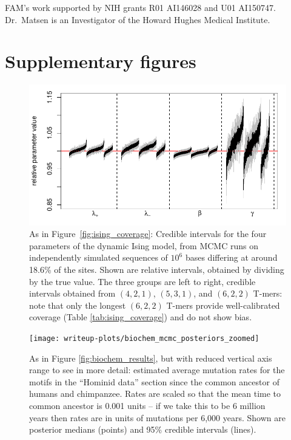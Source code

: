 \documentclass{article}
\theoremstyle{plain}
\theoremstyle{definition}
\newcommand{\beginsupplement}{%
        \setcounter{table}{0}
        \renewcommand{\thetable}{S\arabic{table}}%
        \setcounter{figure}{0}
        \renewcommand{\thefigure}{S\arabic{figure}}%
     }
\begin{document}
FAM's work supported by NIH grants R01 AI146028 and U01 AI150747.
Dr.\ Matsen is an Investigator of the Howard Hughes Medical Institute.




\clearpage

\beginsupplement

\appendix

\section{Supplementary figures}

\begin{figure}[h!]
    \begin{center}
        \includegraphics{writeup-plots/coverage_results_all}
    \end{center}
    \caption{
        As in Figure~\ref{fig:ising_coverage}:
        Credible intervals for the four parameters of the dynamic Ising model,
        from MCMC runs on independently simulated sequences of $10^6$ bases
        differing at around 18.6\% of the sites.
        Shown are relative intervals, obtained by dividing by the true value.
        The three groups are left to right, credible intervals obtained from $(4,2,1)$, $(5,3,1)$, and $(6,2,2)$ T-mers:
        note that only the longest $(6,2,2)$ T-mers provide well-calibrated coverage (Table \ref{tab:ising_coverage})
        and do not show bias.
        \label{fig:all_ising_coverage}}
\end{figure}

\begin{figure}
    \begin{center}
        \texttt{[image: writeup-plots/biochem\_mcmc\_posteriors\_zoomed]}
    \end{center}
    \caption{
        As in Figure \ref{fig:biochem_results}, but with reduced vertical axis range
        to see in more detail:
        estimated average mutation rates
        for the motifs in the ``Hominid data'' section
        since the common ancestor of humans and chimpanzee.
        Rates are scaled so that the mean time to common ancestor is 0.001 units --
        if we take this to be 6 million years \citep{scally2012insights}
        then rates are in units of mutations per 6,000 years.
        Shown are posterior medians (points) and 95\% credible intervals (lines).
        \label{sfig:biochem_results_zoom}}
\end{figure}
\end{document}

